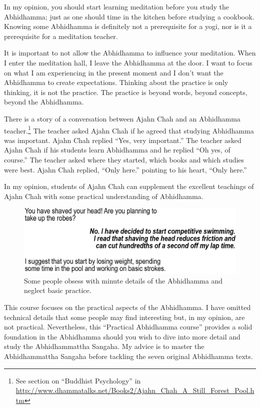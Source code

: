 \color{red}


In my opinion, you should start learning meditation before you study the Abhidhamma; just as one should time in the kitchen before studying a cookbook. Knowing some Abhidhamma is definitely not a prerequisite for a yogi, nor is it a prerequisite for a meditation teacher.

It is important to not allow the Abhidhamma to influence your meditation. When I enter the meditation hall, I leave the Abhidhamma at the door. I want to focus on what I am experiencing in the present moment and I don’t want the Abhidhamma to create expectations. Thinking about the practice is only thinking, it is not the practice. The practice is beyond words, beyond concepts, beyond the Abhidhamma. 

There is a story of a conversation between Ajahn Chah and an Abhidhamma teacher.\footnote{See section on “Buddhist Psychology” in \url{http://www.dhammatalks.net/Books2/Ajahn_Chah_A_Still_Forest_Pool.htm}} The teacher asked Ajahn Chah if he agreed that studying Abhidhamma was important. Ajahn Chah replied  “Yes, very important.” The teacher asked Ajahn Chah if his students learn Abhidhamma and he replied  “Oh yes, of course.” The teacher asked where they started, which books and which studies were best. Ajahn Chah replied, “Only here.” pointing to his heart, “Only here.”

In my opinion, students of Ajahn Chah can supplement the excellent teachings of Ajahn Chah with some practical understanding of Abhidhamma. 

\color{black}

\begin{figure}[h]
\centering
\includegraphics[width=0.7\linewidth]{./Diagrams/Swimming}
\caption{Some people obsess with minute details of the Abhidhamma and neglect basic practice.}
\label{fig:Swimming}
\end{figure}

This course focuses on the practical aspects of the Abhidhamma. I have omitted technical details that some people may find interesting but, in my opinion, are not practical. \color{red} Nevertheless, this “Practical Abhidhamma course” provides a solid foundation in the Abhidhamma should you wish to dive into more detail and study the Abhidhammattha Sangaha. My advice is to master the Abhidhammattha Sangaha before tackling the seven original Abhidhamma texts.

